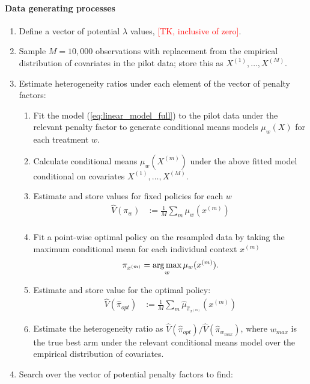 \documentclass[letterpaper, 12pt, parskip=full,]{scrartcl}
\begin{document}
\paragraph{Data generating processes}
\begin{enumerate}
\item Define a vector of potential $\lambda$ values, \textcolor{red}{[TK, inclusive of zero]}. 
\item  Sample $M=10,000$ observations with replacement from the empirical distribution of covariates in the pilot data; store this as $X^{(1)}, \dots,X^{(M)}$. 
\item Estimate heterogeneity ratios under each element of the vector of penalty factors:
\begin{enumerate}
\item Fit the model (\ref{eq:linear_model_full}) to the pilot data under the relevant penalty factor to generate conditional means models $\mu_{w}(X)$ for each treatment $w$.
  \item Calculate conditional means $\mu_{w}(X^{(m)})$ under the above fitted model conditional on covariates $X^{(1)}, \dots,X^{(M)}$. 
  \item Estimate and store values for fixed policies for each $w$
      \begin{align}
          \hat{V}({\pi}_{w})  &:= \frac{1}{M} \sum_{m} \mu_{w}(x^{(m)}) \\
          \end{align}
  \item Fit a point-wise optimal policy on the resampled data by taking the maximum conditional mean for each individual context $x^{(m)}$ 
    \begin{equation}
     \pi_{x^{(m)}} = \operatorname*{arg\,max}_{ w } \mu_{w}(x^{(m)}) . 
    \end{equation} 
    \item Estimate and store value for the optimal policy:
    \begin{align}
      \hat{V}(\hat{\pi}_{opt})  &:= \frac{1}{M} \sum_m \hat{\mu}_{\hat{\pi}_{x^{(m)}}}(x^{(m)}) 
          \end{align}
  \item Estimate the heterogeneity ratio as $\hat{V}(\hat{\pi}_{opt})/\hat{V}(\hat{\pi}_{w_{max}})$, where $w_{max}$ is the true best arm under the relevant conditional means model over the empirical distribution of covariates. 
\end{enumerate}
\item Search over the vector of potential penalty factors to find:

\end{enumerate}
\end{document}
